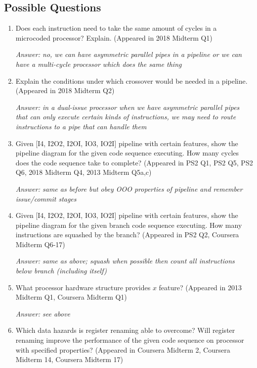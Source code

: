 \documentclass{article}
\begin{document}
\subsection{Possible Questions}
\begin{enumerate}

\item Does each instruction need to take the same amount of cycles in a microcoded processor? Explain. (Appeared in 2018 Midterm Q1)

\textit{Answer: no, we can have asymmetric parallel pipes in a pipeline or we can have a multi-cycle processor which does the same thing}

\item Explain the conditions under which crossover would be needed in a pipeline. (Appeared in 2018 Midterm Q2)

\textit{Answer: in a dual-issue processor when we have asymmetric parallel pipes that can only execute certain kinds of instructions, we may need to route instructions to a pipe that can handle them}

\item Given [I4, I2O2, I2OI, IO3, IO2I] pipeline with certain features, show the pipeline diagram for the given code sequence executing. How many cycles does the code sequence take to complete? (Appeared in PS2 Q1, PS2 Q5, PS2 Q6, 2018 Midterm Q4, 2013 Midterm Q5a,c)

\textit{Answer: same as before but obey OOO properties of pipeline and remember issue/commit stages}

\item Given [I4, I2O2, I2OI, IO3, IO2I] pipeline with certain features, show the pipeline diagram for the given branch code sequence executing. How many instructions are squashed by the branch? (Appeared in PS2 Q2, Coursera Midterm Q6-17)

\textit{Answer: same as above; squash when possible then count all instructions below branch (including itself)}

\item What processor hardware structure provides $x$ feature? (Appeared in 2013 Midterm Q1, Coursera Midterm Q1)

\textit{Answer: see above}

\item Which data hazards is register renaming able to overcome? Will register renaming improve the performance of the given code sequence on processor with specified properties? (Appeared in Coursera Midterm 2, Coursera Midterm 14, Coursera Midterm 17)


\end{enumerate}
\end{document}
